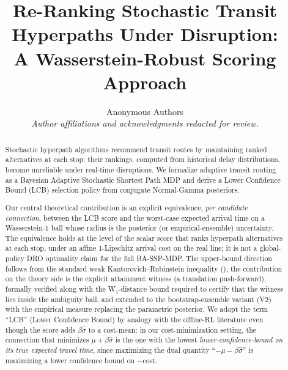 \documentclass[11pt]{article}
\theoremstyle{definition}
\theoremstyle{remark}
\begin{document}
\title{Re-Ranking Stochastic Transit Hyperpaths Under Disruption:\\
       A Wasserstein-Robust Scoring Approach}
\date{}

\author{%
  \normalsize Anonymous Authors\\[0.5em]
  \normalsize\textit{Author affiliations and acknowledgments redacted for review.}
}

\maketitle

\begin{abstract}
Stochastic hyperpath algorithms recommend transit routes by maintaining
ranked alternatives at each stop; their rankings, computed from
historical delay distributions, become unreliable under real-time
disruptions. We formalize adaptive transit routing as a Bayesian
Adaptive Stochastic Shortest Path MDP and derive a Lower Confidence
Bound (LCB) selection policy from conjugate Normal-Gamma posteriors.

Our central theoretical contribution is an explicit equivalence,
\emph{per candidate connection}, between the LCB score and the
worst-case expected arrival time on a Wasserstein-1 ball whose
radius is the posterior (or empirical-ensemble) uncertainty. The
equivalence holds at the level of the scalar score that ranks
hyperpath alternatives at each stop, under an affine 1-Lipschitz
arrival cost on the real line; it is not a global-policy DRO
optimality claim for the full BA-SSP-MDP. The upper-bound direction
follows from the standard weak Kantorovich--Rubinstein inequality
(\cite{esfahani2018,blanchet2019,villani2009}); the contribution on
the theory side is the explicit attainment witness (a translation
push-forward), formally verified along with the W$_1$-distance
bound required to certify that the witness lies inside the
ambiguity ball, and extended to the bootstrap-ensemble variant (V2)
with the empirical measure replacing the parametric posterior. We
adopt the term ``LCB'' (Lower Confidence Bound) by analogy with the
offline-RL literature even though the score adds $\beta\hat\sigma$
to a cost-mean: in our cost-minimization setting, the connection
that minimizes $\mu+\beta\hat\sigma$ is the one with the lowest
\emph{lower-confidence-bound on its true expected travel time},
since maximizing the dual quantity ``$-\mu-\beta\hat\sigma$'' is
maximizing a lower confidence bound on $-$cost.


\end{abstract}
\end{document}
